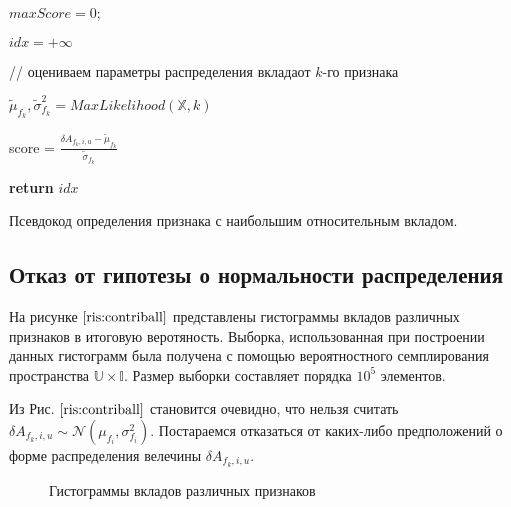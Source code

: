 \documentclass[12pt,a4paper]{report}
\begin{document}
\begin{algorithm}[H]
\SetAlgoLined
{}

$maxScore = 0$;

$idx = +\infty$

 {

// оцениваем параметры распределения вкладаот $k$-го признака

$\tilde{\mu}_{f_k}, \tilde{\sigma}_{f_k}^2 = MaxLikelihood(\mathbb{X}, k)$

score = $\frac{\delta A_{f_k, i, u} - \tilde{\mu}_{f_k}}{\tilde{\sigma}_{f_k}}$

}

\textbf{return} $idx$
\caption{Псевдокод определения признака с наибольшим относительным вкладом.}
\label{alg:normalAI}
\end{algorithm}

\subsection{Отказ от гипотезы о нормальности распределения}
На рисунке $\ref{ris:contriball}$ представлены гистограммы вкладов различных признаков в итоговую веротяность. Выборка, использованная при построении данных гистограмм была получена с помощью вероятностного семплирования пространства $\mathbb{U} \times \mathbb{I}$. Размер выборки составляет порядка $10^5$ элементов.

Из Рис. $\ref{ris:contriball}$ становится очевидно, что нельзя считать $\delta A_{f_k, i, u} \sim \mathcal{N}(\mu_{f_i}, \sigma_{f_i}^2)$. Постараемся отказаться от каких-либо предположений о форме распределения велечины $\delta A_{f_k, i, u}$.

\begin{figure}[pH]
\begin{minipage}[h]{0.49\linewidth}
\end{minipage}
\hfill
\begin{minipage}[h]{0.49\linewidth}
\end{minipage}
\begin{minipage}[h]{1.\linewidth}
\end{minipage}
\caption{Гистограммы вкладов различных признаков}
\label{ris:contriball}
\end{figure}
\end{document}
